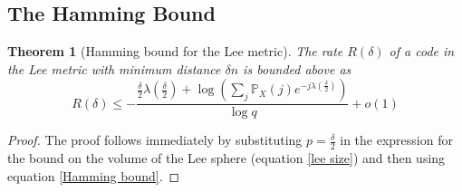 \documentclass[conference,letterpaper]{IEEEtran}
\newtheorem{theorem}{Theorem}
\newtheorem{lemma}[theorem]{Lemma}
\begin{document}
\subsection{The Hamming Bound}

\begin{theorem}[Hamming bound for the Lee metric] The rate $R(\delta)$ of a code in the Lee metric with minimum distance $\delta n$ is bounded above as
\begin{equation}
    R(\delta) \leq -\frac{\frac{\delta}{2} \lambda(\frac{\delta}{2}) + \log \left(\sum_j \mathbb{P}_X(j) e^{-j \lambda(\frac{\delta}{2})}\right)}{\log q} + o(1)
\end{equation}
\end{theorem}
\begin{proof}
The proof follows immediately by substituting $p = \frac{\delta}{2}$ in the expression for the bound on the volume of the Lee sphere (equation \cref{lee size}) and then using equation \cref{Hamming bound}.
\end{proof}
\end{document}
